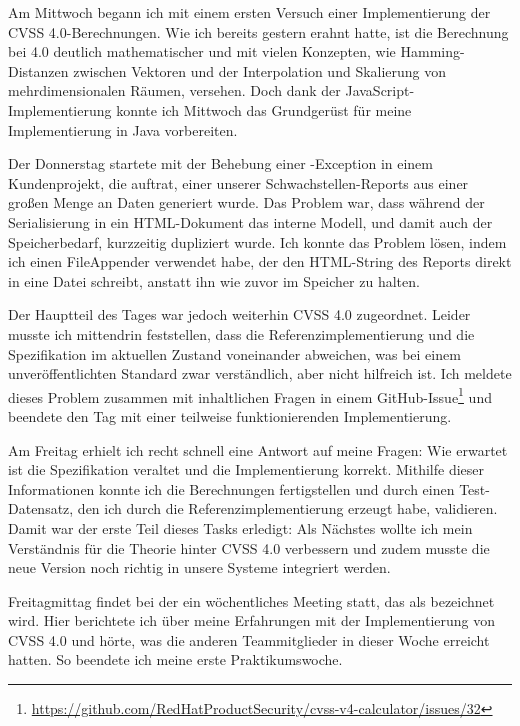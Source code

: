 \sweekdaymarginpar{\weekdayWednesdayLong}

Am Mittwoch begann ich mit einem ersten Versuch einer Implementierung der CVSS 4.0-Berechnungen.
Wie ich bereits gestern erahnt hatte, ist die Berechnung bei 4.0 deutlich mathematischer und mit vielen Konzepten, wie Hamming-Distanzen zwischen Vektoren und der Interpolation und Skalierung von mehrdimensionalen Räumen, versehen.
Doch dank der JavaScript-Implementierung konnte ich Mittwoch das Grundgerüst für meine Implementierung in Java vorbereiten.

\sweekdaymarginpar{\weekdayThursdayLong}

Der Donnerstag startete mit der Behebung einer -Exception in einem Kundenprojekt, die auftrat, einer unserer Schwachstellen-Reports aus einer großen Menge an Daten generiert wurde.
Das Problem war, dass während der Serialisierung in ein HTML-Dokument das interne Modell, und damit auch der Speicherbedarf, kurzzeitig dupliziert wurde.
Ich konnte das Problem lösen, indem ich einen FileAppender verwendet habe, der den HTML-String des Reports direkt in eine Datei schreibt, anstatt ihn wie zuvor im Speicher zu halten.

Der Hauptteil des Tages war jedoch weiterhin CVSS 4.0 zugeordnet.
Leider musste ich mittendrin feststellen, dass die Referenzimplementierung und die Spezifikation im aktuellen Zustand voneinander abweichen, was bei einem unveröffentlichten Standard zwar verständlich, aber nicht hilfreich ist.
Ich meldete dieses Problem zusammen mit inhaltlichen Fragen in einem GitHub-Issue\footnote{\url{https://github.com/RedHatProductSecurity/cvss-v4-calculator/issues/32}} und beendete den Tag mit einer teilweise funktionierenden Implementierung.

\sweekdaymarginpar{\weekdayFridayLong}

Am Freitag erhielt ich recht schnell eine Antwort auf meine Fragen:
Wie erwartet ist die Spezifikation veraltet und die Implementierung korrekt.
Mithilfe dieser Informationen konnte ich die Berechnungen fertigstellen und durch einen Test-Datensatz, den ich durch die Referenzimplementierung erzeugt habe, validieren.
Damit war der erste Teil dieses Tasks erledigt:
Als Nächstes wollte ich mein Verständnis für die Theorie hinter CVSS 4.0 verbessern und zudem musste die neue Version noch richtig in unsere Systeme integriert werden.

Freitagmittag findet bei der {\metaeffekt} ein wöchentliches Meeting statt, das als  bezeichnet wird.
Hier berichtete ich über meine Erfahrungen mit der Implementierung von CVSS 4.0 und hörte, was die anderen Teammitglieder in dieser Woche erreicht hatten.
So beendete ich meine erste Praktikumswoche.
